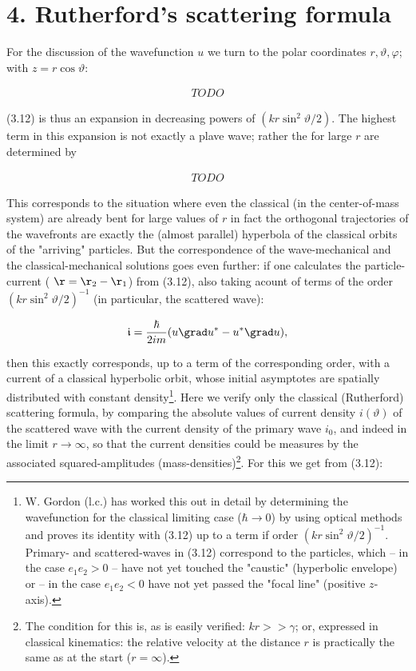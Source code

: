\documentclass{report}
\newcommand{\nequ}[2]{
\begin{align*}
#1
\tag{#2}
\end{align*}
}
\newcommand{\uequ}[1]{
\begin{align*}
#1
\end{align*}
}
\begin{document}
\section*{4. Rutherford's scattering formula}

For the discussion of the wavefunction $u$ we turn to the polar coordinates $r,\vartheta,\varphi$; with $z=r\cos\vartheta$:
\nequ{
TODO
}{4.1}
(3.12) is thus an expansion in decreasing powers of $(kr\sin^2\vartheta/2)$. The highest term in this expansion is not exactly a plave wave; rather the  for large $r$ are determined by
\uequ{
TODO
}
This corresponds to the situation where even the classical  (in the center-of-mass system) are already bent for large values of $r$ in fact the orthogonal trajectories of the wavefronts are exactly the (almost parallel) hyperbola of the classical orbits of the "arriving" particles. But the correspondence of the wave-mechanical and the classical-mechanical solutions goes even further: if one calculates the particle-current ( $\r=\r_2 - \r_1$) from (3.12), also taking acount of terms of the order $(kr\sin^2 \vartheta/2)^{-1}$ (in particular, the scattered wave):
\uequ{
\mathfrak{i} = \frac{\hbar}{2im}(u\grad u^* - u^* \grad u),
}
then this exactly corresponds, up to a term of the corresponding order, with a current of a classical hyperbolic orbit, whose initial asymptotes are spatially distributed with constant density\footnote{W. Gordon (l.c.) has worked this out in detail by determining the wavefunction for the classical limiting case ($\hbar \to 0$) by using optical methods and proves its identity with (3.12) up to a term if order $(kr\sin^2\vartheta/2)^{-1}$. Primary- and scattered-waves in (3.12) correspond to the particles, which -- in the case $e_1 e_2 > 0$ -- have not yet touched the "caustic" (hyperbolic envelope) or -- in the case $e_1 e_2 < 0$ have not yet passed the "focal line" (positive $z$-axis).}. Here we verify only the classical (Rutherford) scattering formula, by comparing the absolute values of current density $i(\vartheta)$ of the scattered wave with the current density of the primary wave $i_0$, and indeed in the limit $r \to \infty$, so that the current densities could be measures by the associated squared-amplitudes (mass-densities)\footnote{The condition for this is, as is easily verified: $kr >> \gamma$; or, expressed in classical kinematics: the relative velocity at the distance $r$ is practically the same as at the start ($r=\infty$).}. For this we get from (3.12):
\end{document}
